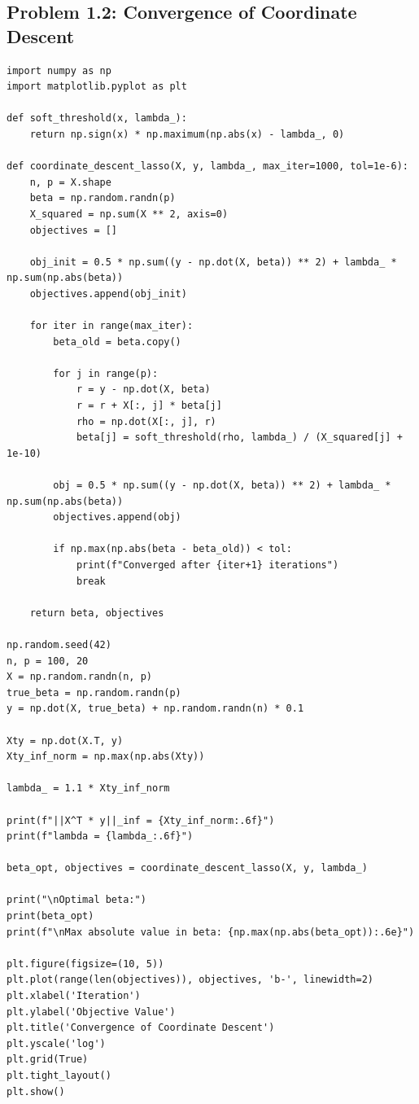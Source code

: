 \documentclass[11pt]{article}
\begin{document}
\subsection{Problem 1.2: Convergence of Coordinate Descent}
\begin{verbatim}
import numpy as np
import matplotlib.pyplot as plt

def soft_threshold(x, lambda_):
    return np.sign(x) * np.maximum(np.abs(x) - lambda_, 0)

def coordinate_descent_lasso(X, y, lambda_, max_iter=1000, tol=1e-6):
    n, p = X.shape
    beta = np.random.randn(p)
    X_squared = np.sum(X ** 2, axis=0)
    objectives = []
    
    obj_init = 0.5 * np.sum((y - np.dot(X, beta)) ** 2) + lambda_ * np.sum(np.abs(beta))
    objectives.append(obj_init)
    
    for iter in range(max_iter):
        beta_old = beta.copy()
        
        for j in range(p):
            r = y - np.dot(X, beta)
            r = r + X[:, j] * beta[j]
            rho = np.dot(X[:, j], r)
            beta[j] = soft_threshold(rho, lambda_) / (X_squared[j] + 1e-10)
        
        obj = 0.5 * np.sum((y - np.dot(X, beta)) ** 2) + lambda_ * np.sum(np.abs(beta))
        objectives.append(obj)
        
        if np.max(np.abs(beta - beta_old)) < tol:
            print(f"Converged after {iter+1} iterations")
            break

    return beta, objectives

np.random.seed(42)
n, p = 100, 20
X = np.random.randn(n, p)
true_beta = np.random.randn(p)
y = np.dot(X, true_beta) + np.random.randn(n) * 0.1

Xty = np.dot(X.T, y)
Xty_inf_norm = np.max(np.abs(Xty))

lambda_ = 1.1 * Xty_inf_norm

print(f"||X^T * y||_inf = {Xty_inf_norm:.6f}")
print(f"lambda = {lambda_:.6f}")

beta_opt, objectives = coordinate_descent_lasso(X, y, lambda_)

print("\nOptimal beta:")
print(beta_opt)
print(f"\nMax absolute value in beta: {np.max(np.abs(beta_opt)):.6e}")

plt.figure(figsize=(10, 5))
plt.plot(range(len(objectives)), objectives, 'b-', linewidth=2)
plt.xlabel('Iteration')
plt.ylabel('Objective Value')
plt.title('Convergence of Coordinate Descent')
plt.yscale('log')
plt.grid(True)
plt.tight_layout()
plt.show()
\end{verbatim}
\end{document}
